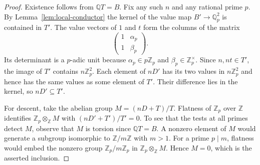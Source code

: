 \begin{proof}
    Existence follows from $\mathbb{Q}T = B$.
    Fix any such $n$ and any rational prime $p$.
    By Lemma~\ref{lem:local-conductor} the kernel of the value map $B' \to \mathbb{Q}_p^2$ is contained in $T'$.
    The value vectors of $1$ and $t$ form the columns of the matrix
    \[
        \begin{pmatrix}
            1 & \alpha_p \\
            1 & \beta_p
        \end{pmatrix}.
    \]
    Its determinant is a $p$-adic unit because $\alpha_p \in p\mathbb{Z}_p$ and $\beta_p \in \mathbb{Z}_p^\times$.
    Since $n, nt \in T'$, the image of $T'$ contains $n\mathbb{Z}_p^2$.
    Each element of $nD'$ has its two values in $n\mathbb{Z}_p^2$ and hence has the same values as some element of $T'$.
    Their difference lies in the kernel, so $nD' \subseteq T'$.

    For descent, take the abelian group $M = (nD + T)/T$.
    Flatness of $\mathbb{Z}_p$ over $\mathbb{Z}$ identifies $\mathbb{Z}_p \otimes_{\mathbb{Z}} M$ with $(nD' + T')/T' = 0$.
    To see that the tests at all primes detect $M$, observe that $M$ is torsion since $\mathbb{Q}T = B$.
    A nonzero element of $M$ would generate a subgroup isomorphic to $\mathbb{Z}/m\mathbb{Z}$ with $m > 1$.
    For a prime $p \mid m$, flatness would embed the nonzero group $\mathbb{Z}_p/m\mathbb{Z}_p$ in $\mathbb{Z}_p \otimes_{\mathbb{Z}} M$.
    Hence $M = 0$, which is the asserted inclusion.
\end{proof}
